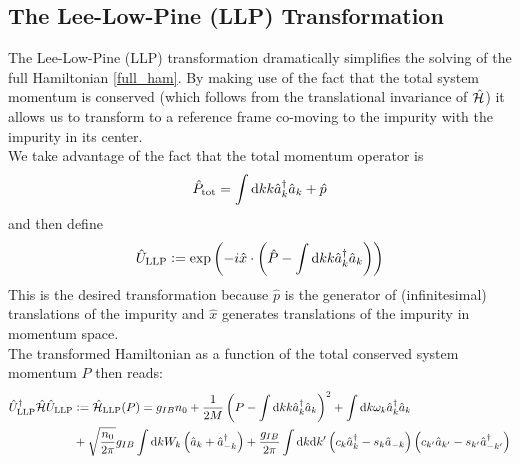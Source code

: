 \subsection{The Lee-Low-Pine (LLP) Transformation}
The Lee-Low-Pine (LLP) transformation \cite{LLP} dramatically simplifies the solving of the full Hamiltonian \ref{full_ham}. By making use of the fact that the total system momentum is conserved (which follows from the translational invariance of $\hat{\mathcal{H}}$) it allows us to transform to a reference frame co-moving to the impurity with the impurity in its center. \\
We take advantage of the fact that the total momentum operator is 
\begin{equation}
\hat P_{\mathrm{tot}} = \int\mathrm d k k \hat a^\dagger_k\hat a_k + \hat p
\end{equation}
and then define
\begin{equation}
\hat U_{\mathrm{LLP}}\vcentcolon= \exp\left(-i\hat x\cdot \left(\hat P - \int\mathrm d k k \hat a^\dagger_k\hat a_k\right)\right)
\end{equation}
This is the desired transformation because $\hat p$ is the generator of (infinitesimal) translations of the impurity and $\hat x$ generates translations of the impurity in momentum space.\\
The transformed Hamiltonian as a function of the total conserved system momentum $P$ then reads:
\begin{align}\label{ham_LLP}
\hat U_{\mathrm{LLP}}^\dagger\hat{\mathcal{H}}\hat U_{\mathrm{LLP}} &\vcentcolon= \hat{\mathcal{H}}_{\mathrm{LLP}}(P) =g_{IB}n_0+\frac{1}{2M}\left(P-\int\mathrm d k k \hat a^\dagger_k\hat a_k \right)^2+\int\mathrm d k\omega_{ k}\hat a^\dagger_{ k}\hat a_{ k}\\
&+\sqrt{\frac{n_0}{2\pi}}g_{IB}\int \mathrm d k W_k \left(\hat a_{ k}+\hat a^\dagger_{- k}\right) + \frac{g_{IB}}{2\pi}\int\mathrm d k\mathrm d k^\prime \left(c_k\hat a^\dagger_k-s_k\hat a_{-k}\right)\left(c_{k^\prime}\hat a_{k^\prime}-s_{k^\prime}\hat a^\dagger_{-k^\prime}\right)\nonumber
\end{align}



